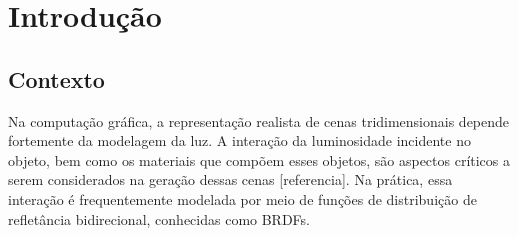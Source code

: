 \documentclass[english, 
               brazil, 
               bsc] %
               {dcomp-abntex2}
\begin{document}

\frenchspacing 


\pretextual



\inserirInformacoesPDF

\imprimircapa
\imprimirfolhaderosto*

% 
% 
% 

% 


\mostrarlistadeILUSTRACOES
\mostrarlistadeQUADROS
\mostrarlistadeTABELAS
 

% 
    
\mostrarSUMARIO


\textual

\chapter{Introdução}


\section{Contexto}

Na computação gráfica, a representação realista de cenas tridimensionais depende fortemente da modelagem da luz. A interação da luminosidade incidente no objeto, bem como os materiais que compõem esses objetos, são aspectos críticos a serem considerados na geração dessas cenas [referencia]. Na prática, essa interação é frequentemente modelada por meio de funções de distribuição de refletância bidirecional, conhecidas como BRDFs.
\end{document}
